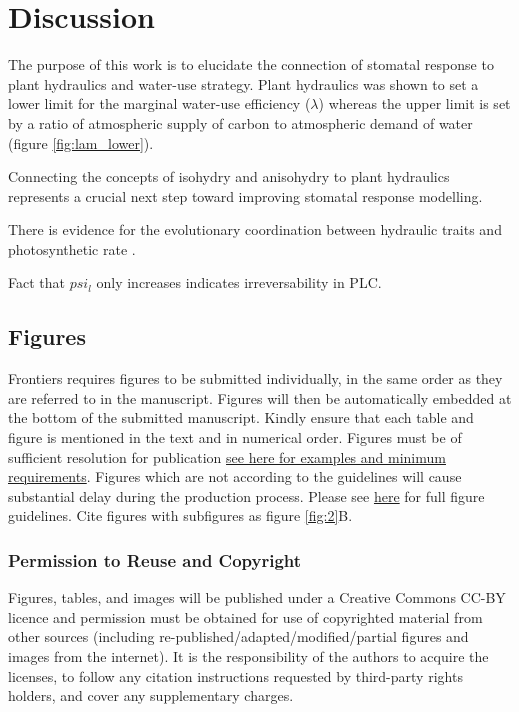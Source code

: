 \documentclass[utf8]{frontiersSCNS} %
\begin{document}
\section{Discussion}

The purpose of this work is to elucidate the connection of stomatal response to plant hydraulics and water-use strategy. Plant hydraulics was shown to set a lower limit for the marginal water-use efficiency ($\lambda$) whereas the upper limit is set by a ratio of atmospheric supply of carbon to atmospheric demand of water (figure \ref{fig:lam_lower}).

Connecting the concepts of isohydry and anisohydry to plant hydraulics represents a crucial next step toward improving stomatal response modelling. 

There is evidence for the evolutionary coordination between hydraulic traits and photosynthetic rate \citep{Scoffoni2016}. 

Fact that $psi_l$ only increases indicates irreversability in PLC.

\subsection{Figures}
Frontiers requires figures to be submitted individually, in the same order as they are referred to in the manuscript. Figures will then be automatically embedded at the bottom of the submitted manuscript. Kindly ensure that each table and figure is mentioned in the text and in numerical order. Figures must be of sufficient resolution for publication \href{http://home.frontiersin.org/about/author-guidelines#ResolutionRequirements}{see here for examples and minimum requirements}. Figures which are not according to the guidelines will cause substantial delay during the production process. Please see \href{http://home.frontiersin.org/about/author-guidelines#GeneralStyleGuidelinesforFigures}{here} for full figure guidelines. Cite figures with subfigures as figure \ref{fig:2}B.


\subsubsection{Permission to Reuse and Copyright}
Figures, tables, and images will be published under a Creative Commons CC-BY licence and permission must be obtained for use of copyrighted material from other sources (including re-published/adapted/modified/partial figures and images from the internet). It is the responsibility of the authors to acquire the licenses, to follow any citation instructions requested by third-party rights holders, and cover any supplementary charges.
\end{document}
